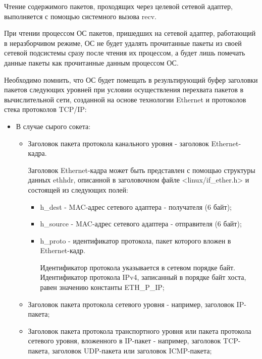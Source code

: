 \begin{enumerate}
			Чтение содержимого пакетов, проходящих через целевой сетевой адаптер, выполняется с помощью
			системного вызова recv.
			
			При чтении процессом ОС пакетов, пришедших на сетевой адаптер,
			работающий в неразборчивом режиме, ОС не будет удалять прочитанные пакеты из своей сетевой подсистемы
			сразу после чтения их процессом, а будет лишь помечать данные пакеты как прочитанные данным процессом
			ОС.

			Необходимо помнить, что ОС будет помещать в результирующий буфер заголовки пакетов
			следующих уровней при условии осуществления перехвата пакетов в вычислительной сети, созданной на основе
			технологии Ethernet и протоколов стека протоколов TCP/IP:

			\begin{itemize}

				\item В случае сырого сокета:

					\begin{itemize}

						\item Заголовок пакета протокола канального уровня - заголовок Ethernet-кадра.

							Заголовок Ethernet-кадра может быть представлен с помощью структуры данных ethhdr,
							описанной в заголовочном файле <linux/if\_ether.h> и состоящей из следующих полей:

							\begin{itemize}

								\item h\_dest - MAC-адрес сетевого адаптера - получателя (6 байт);
								\item h\_source - MAC-адрес сетевого адаптера - отправителя (6 байт);
								\item h\_proto - идентификатор протокола, пакет которого вложен в Ethernet-кадр.

									Идентификатор протокола указывается в сетевом порядке байт. Идентификатор протокола
									IPv4, записанный в порядке байт хоста, равен значению константы ETH\_P\_IP;

							\end{itemize}

						\item Заголовок пакета протокола сетевого уровня - например, заголовок IP-пакета;
						\item Заголовок пакета протокола транспортного уровня или пакета протокола сетевого уровня,
						вложенного в IP-пакет - например, заголовок TCP-пакета, заголовок UDP-пакета или заголовок
						ICMP-пакета;


\end{itemize}
\end{itemize}
\end{enumerate}
